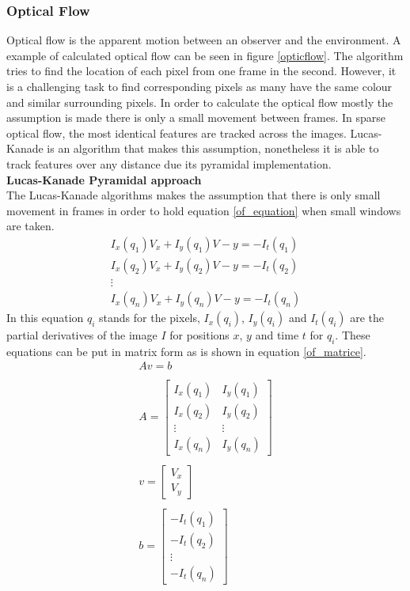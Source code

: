 \documentclass[a4paper]{article}
\begin{document}
\subsubsection{Optical Flow}
\label{opticalflow}
Optical flow is the apparent motion between an observer and the environment. A example of calculated optical flow can be seen in figure \ref{opticflow}. The algorithm tries to find the location of each pixel from one frame in the second. However, it is a challenging task to find corresponding pixels as many have the same colour and similar surrounding pixels. In order to calculate the optical flow mostly the assumption is made there is only a small movement between frames. In sparse optical flow, the most identical features are tracked across the images. Lucas-Kanade is an algorithm that makes this assumption, nonetheless it is able to track features over any distance due its pyramidal implementation.\\

\noindent\textbf{Lucas-Kanade Pyramidal approach}\\
The Lucas-Kanade algorithms makes the assumption that there is only small movement in frames in order to hold equation \ref{of_equation} when small windows are taken.
\begin{equation}
\label{of_equation}
\begin{matrix}
I_x(q_1)V_x + I_y(q_1)V - y = -I_t(q_1)\\
I_x(q_2)V_x + I_y(q_2)V - y = -I_t(q_2)\\
\vdots\\
I_x(q_n)V_x + I_y(q_n)V - y = -I_t(q_n)
\end{matrix}
\end{equation}
In this equation $q_i$ stands for the pixels, $I_x(q_i)$, $I_y(q_i)$ and $I_t(q_i)$ are the partial derivatives of the image $I$ for positions $x$, $y$ and time $t$ for $q_i$. These equations can be put in matrix form as is shown in equation \ref{of_matrice}.
\begin{equation}
\label{of_matrice}
\begin{matrix}
Av = b\\\\
A = \begin{bmatrix}
I_x(q_1) & I_y(q_1)\\
I_x(q_2) & I_y(q_2)\\
\vdots & \vdots\\
I_x(q_n) & I_y(q_n)
\end{bmatrix}\\\\
v = \begin{bmatrix}
V_x\\
V_y
\end{bmatrix}\\\\
b = \begin{bmatrix}
-I_t(q_1)\\
-I_t(q_2)\\
\vdots\\
-I_t(q_n)
\end{bmatrix}

\end{matrix}
\end{equation}
\end{document}

